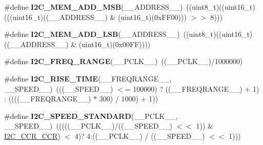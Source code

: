 \begin{DoxyCompactItemize}
\item 
\hypertarget{group___i2_c___private___macro_ga2e42fa55be22240dc5a54a0304d01cfb}{\#define {\bfseries I2\-C\-\_\-\-M\-E\-M\-\_\-\-A\-D\-D\-\_\-\-M\-S\-B}(\-\_\-\-\_\-\-A\-D\-D\-R\-E\-S\-S\-\_\-\-\_\-)~((uint8\-\_\-t)((uint16\-\_\-t)(((uint16\-\_\-t)((\-\_\-\-\_\-\-A\-D\-D\-R\-E\-S\-S\-\_\-\-\_\-) \& (uint16\-\_\-t)(0x\-F\-F00))) $>$$>$ 8)))}\label{group___i2_c___private___macro_ga2e42fa55be22240dc5a54a0304d01cfb}

\item 
\hypertarget{group___i2_c___private___macro_ga9c8f1a763307d0c37bb4e2dcfdf3bb9f}{\#define {\bfseries I2\-C\-\_\-\-M\-E\-M\-\_\-\-A\-D\-D\-\_\-\-L\-S\-B}(\-\_\-\-\_\-\-A\-D\-D\-R\-E\-S\-S\-\_\-\-\_\-)~((uint8\-\_\-t)((uint16\-\_\-t)((\-\_\-\-\_\-\-A\-D\-D\-R\-E\-S\-S\-\_\-\-\_\-) \& (uint16\-\_\-t)(0x00\-F\-F))))}\label{group___i2_c___private___macro_ga9c8f1a763307d0c37bb4e2dcfdf3bb9f}

\item 
\hypertarget{group___i2_c___private___macro_gadf8772bb90a3c6e3f2a63b60b4af1244}{\#define {\bfseries I2\-C\-\_\-\-F\-R\-E\-Q\-\_\-\-R\-A\-N\-G\-E}(\-\_\-\-\_\-\-P\-C\-L\-K\-\_\-\-\_\-)~((\-\_\-\-\_\-\-P\-C\-L\-K\-\_\-\-\_\-)/1000000)}\label{group___i2_c___private___macro_gadf8772bb90a3c6e3f2a63b60b4af1244}

\item 
\hypertarget{group___i2_c___private___macro_ga27cae7b1432cd160ab708e1548ba3165}{\#define {\bfseries I2\-C\-\_\-\-R\-I\-S\-E\-\_\-\-T\-I\-M\-E}(\-\_\-\-\_\-\-F\-R\-E\-Q\-R\-A\-N\-G\-E\-\_\-\-\_\-, \-\_\-\-\_\-\-S\-P\-E\-E\-D\-\_\-\-\_\-)~(((\-\_\-\-\_\-\-S\-P\-E\-E\-D\-\_\-\-\_\-) $<$= 100000) ? ((\-\_\-\-\_\-\-F\-R\-E\-Q\-R\-A\-N\-G\-E\-\_\-\-\_\-) + 1) \-: ((((\-\_\-\-\_\-\-F\-R\-E\-Q\-R\-A\-N\-G\-E\-\_\-\-\_\-) $\ast$ 300) / 1000) + 1))}\label{group___i2_c___private___macro_ga27cae7b1432cd160ab708e1548ba3165}

\item 
\hypertarget{group___i2_c___private___macro_gaa71590c93b126e79fc86afbc819742b3}{\#define {\bfseries I2\-C\-\_\-\-S\-P\-E\-E\-D\-\_\-\-S\-T\-A\-N\-D\-A\-R\-D}(\-\_\-\-\_\-\-P\-C\-L\-K\-\_\-\-\_\-, \-\_\-\-\_\-\-S\-P\-E\-E\-D\-\_\-\-\_\-)~(((((\-\_\-\-\_\-\-P\-C\-L\-K\-\_\-\-\_\-)/((\-\_\-\-\_\-\-S\-P\-E\-E\-D\-\_\-\-\_\-) $<$$<$ 1)) \& \hyperlink{group___peripheral___registers___bits___definition_ga5c8cb2bd83dd7dbdcf6ca4bbf4a841de}{I2\-C\-\_\-\-C\-C\-R\-\_\-\-C\-C\-R}) $<$ 4)? 4\-:((\-\_\-\-\_\-\-P\-C\-L\-K\-\_\-\-\_\-) / ((\-\_\-\-\_\-\-S\-P\-E\-E\-D\-\_\-\-\_\-) $<$$<$ 1)))}\label{group___i2_c___private___macro_gaa71590c93b126e79fc86afbc819742b3}


\end{DoxyCompactItemize}
